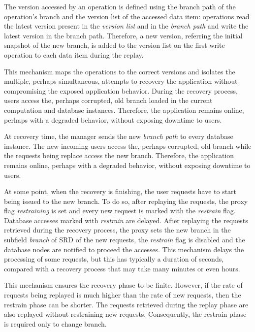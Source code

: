 The version accessed by an operation is defined using the branch path of the operation's branch and the version list of the accessed data item: operations read the latest version present in the \emph{version list} and in the \emph{branch path} and write the latest version in the branch path. Therefore, a new version, referring the initial snapshot of the new branch, is added to the version list on the first write operation to each data item during the replay.

This mechanism maps the operations to the correct versions and isolates the multiple, perhaps simultaneous, attempts to recovery the application without compromising the exposed application behavior. During the recovery process, users access the, perhaps corrupted, old branch loaded in the current computation and database instances. Therefore, the application remains online, perhaps with a degraded behavior, without exposing downtime to users.

At recovery time, the manager sends the new \emph{branch path} to every database instance. The new incoming users access the, perhaps corrupted, old branch while the requests being replace access the new branch. Therefore, the application remains online, perhaps with a degraded behavior, without exposing downtime to users. 

At some point, when the recovery is finishing, the user requests have to start being issued to the new branch. To do so, after replaying the requests, the proxy flag \emph{restraining} is set and every new request is marked with the \emph{restrain} flag. Database accesses marked with \emph{restrain} are delayed. After replaying the requests retrieved during the recovery process, the proxy sets the new branch in the subfield \emph{branch} of \ac{SRD} of the new requests, the \emph{restrain} flag is disabled and the database nodes are notified to proceed the accesses. This mechanism delays the processing of some requests, but this has typically a duration of seconds, compared with a recovery process that may take many minutes or even hours. 

This mechanism ensures the recovery phase to be finite. However, if the rate of requests being replayed is much higher than the rate of new requests, then the restrain phase can be shorter. The requests retrieved during the replay phase are also replayed without restraining new requests. Consequently, the restrain phase is required only to change branch. 

